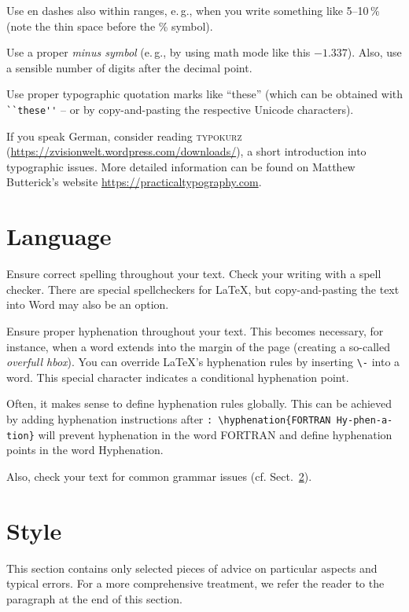Use en dashes also within ranges, e.\,g., when you write something like 5--10\,\% (note the thin space before the \% symbol).

Use a proper \emph{minus symbol} (e.\,g., by using math mode like this \(-1.337\)). Also, use a sensible number of digits after the decimal point.

Use proper typographic quotation marks like ``these'' (which can be obtained with \verb|``these''| -- or by copy-and-pasting the respective Unicode characters).

If you speak German, consider reading \textsc{typokurz} (\url{https://zvisionwelt.wordpress.com/downloads/}), a short introduction into typographic issues. More detailed information can be found on Matthew Butterick's website \url{https://practicaltypography.com}.

\section{Language}

Ensure correct spelling throughout your text. Check your writing with a spell checker. There are special spellcheckers for LaTeX, but copy-and-pasting the text into Word may also be an option.

Ensure proper hyphenation throughout your text. This becomes necessary, for instance, when a word extends into the margin of the page (creating a so-called \emph{overfull hbox}). You can override LaTeX's hyphenation rules by inserting \verb|\-| into a word. This special character indicates a conditional hyphenation point.

Often, it makes sense to define hyphenation rules globally. This can be achieved by adding hyphenation instructions after \verb|: |\verb|\hyphenation{FORTRAN Hy-phen-a-tion}| will prevent hyphenation in the word FORTRAN and define hyphenation points in the word Hyphenation.

Also, check your text for common grammar issues (cf. Sect.~\ref{sec:style}).

\section{Style}
\label{sec:style}

This section contains only selected pieces of advice on particular aspects and typical errors. For a more comprehensive treatment, we refer the reader to the paragraph  at the end of this section.

